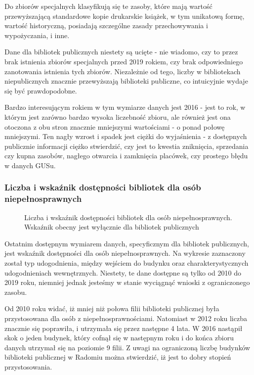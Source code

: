 \documentclass[12pt]{article}
\begin{document}
Do zbiorów specjalnych klasyfikują się te zasoby, które mają wartość przewyższającą standardowe kopie drukarskie książek, w tym unikatową formę, wartość historyczną, 
posiadają szczególne zasady przechowywania i wypożyczania, i inne.

Dane dla bibliotek publicznych niestety są ucięte - nie wiadomo, czy to przez brak istnienia zbiorów specjalnych przed 2019 rokiem, czy brak odpowiedniego zanotowania
istnienia tych zbiorów. Niezależnie od tego, liczby w bibliotekach niepublicznych znacznie przewyższają biblioteki publiczne, co intuicyjnie wydaje się być prawdopodobne.

Bardzo interesującym rokiem w tym wymiarze danych jest 2016 - jest to rok, w którym jest zarówno bardzo wysoka liczebność zbioru, ale również jest ona otoczona z obu stron 
znacznie mniejszymi wartościami - o ponad połowę mniejszymi. Ten nagły wzrost i spadek jest ciężki do wyjaśnienia - z dostępnych publicznie informacji ciężko stwierdzić, 
czy jest to kwestia zniknięcia, sprzedania czy kupna zasobów, nagłego otwarcia i zamknięcia placówek, czy prostego błędu w danych GUSu.   

\subsubsection{Liczba i wskaźnik dostępności bibliotek dla osób niepełnosprawnych}
\begin{figure}[H]
    
    \caption{Liczba i wskaźnik dostępności bibliotek dla osób niepełnosprawnych. Wskaźnik obecny jest wyłącznie 
    dla bibliotek publicznych}
\end{figure}

Ostatnim dostępnym wymiarem danych, specyficznym dla bibliotek publicznych, jest wskaźnik dostępności dla osób niepełnosprawnych. Na wykresie zaznaczony został
typ udogodnienia, między wejściem do budynku oraz charakterystycznych udogodnieniach wewnętrznych. Niestety, te dane dostępne są tylko od 2010 
do 2019 roku, niemniej jednak jesteśmy w stanie wyciągnąć wnioski z ograniczonego zasobu.

Od 2010 roku widać, iż mniej niż połowa filii biblioteki publicznej była przystosowana dla osób z niepełnosprawnościami. Natomiast w 2012 roku liczba znacznie się poprawiła, 
i utrzymała się przez następne 4 lata. W 2016 nastąpił skok o jeden budynek, który cofnął się w następnym roku i do końca zbioru danych utrzymał się na poziomie 9 filii.
Z uwagi na ograniczoną liczbę budynków biblioteki publicznej w Radomiu można stwierdzić, iż jest to dobry stopień przystosowania.
\end{document}
